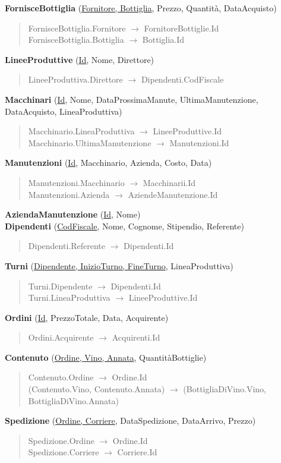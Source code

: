 \textbf{FornisceBottiglia} (\underline{Fornitore, Bottiglia}, Prezzo, Quantità, DataAcquisto)
\begin{verse}
	FornisceBottiglia.Fornitore $\to$ FornitoreBottiglie.Id\\
	FornisceBottiglia.Bottiglia $\to$ Bottiglia.Id
\end{verse} 
\textbf{LineeProduttive} (\underline{Id}, Nome, Direttore)
\begin{verse}
	LineeProduttiva.Direttore $\to$ Dipendenti.CodFiscale
\end{verse} 
\textbf{Macchinari} (\underline{Id}, Nome, DataProssimaManute, UltimaManutenzione, DataAcquisto, LineaProduttiva)
\begin{verse}
	Macchinario.LineaProduttiva $\to$ LineeProduttive.Id\\
	Macchinario.UltimaManutenzione $\to$ Manutenzioni.Id\\
\end{verse} 
\textbf{Manutenzioni} (\underline{Id}, Macchinario, Azienda, Costo, Data)
\begin{verse}
	Manutenzioni.Macchinario $\to$ Macchinarii.Id\\
	Manutenzioni.Azienda $\to$ AziendeManutenzione.Id
\end{verse} 
\textbf{AziendaManutenzione} (\underline{Id}, Nome)\\
\textbf{Dipendenti} (\underline{CodFiscale}, Nome, Cognome, Stipendio, Referente)
\begin{verse}
	Dipendenti.Referente $\to$ Dipendenti.Id
\end{verse} 
\textbf{Turni} (\underline{Dipendente, InizioTurno, FineTurno}, LineaProduttiva)
\begin{verse}
	Turni.Dipendente $\to$ Dipendenti.Id\\
	Turni.LineaProduttiva $\to$ LineeProduttive.Id
\end{verse} 
\textbf{Ordini} (\underline{Id}, PrezzoTotale, Data, Acquirente)
\begin{verse}
	Ordini.Acquirente $\to$ Acquirenti.Id
\end{verse} 
\textbf{Contenuto} (\underline{Ordine, Vino, Annata}, QuantitàBottiglie)
\begin{verse}
	Contenuto.Ordine $\to$ Ordine.Id\\
	(Contenuto.Vino, Contenuto.Annata) $\to$ (BottigliaDiVino.Vino, BottigliaDiVino.Annata)
\end{verse} 
\textbf{Spedizione} (\underline{Ordine, Corriere}, DataSpedizione, DataArrivo, Prezzo)
\begin{verse}
	Spedizione.Ordine $\to$ Ordine.Id\\
	Spedizione.Corriere $\to$ Corriere.Id
\end{verse} 
